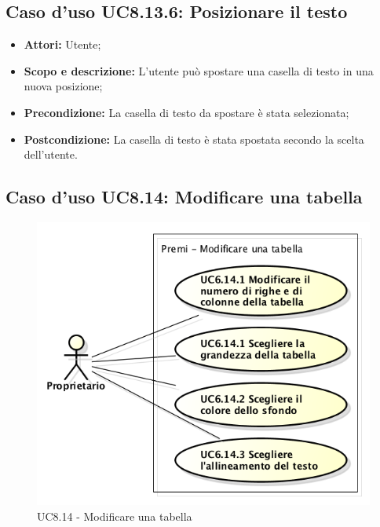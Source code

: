 \subsection{Caso d'uso UC8.13.6: Posizionare il testo}
\begin{itemize}
	\item \textbf{Attori:} Utente;
	\item \textbf{Scopo e descrizione:} L'utente può spostare una casella di testo in una nuova posizione;
	\item \textbf{Precondizione:} La casella di testo da spostare è stata selezionata;
	\item \textbf{Postcondizione:} La casella di testo è stata spostata secondo la scelta dell'utente.
\end{itemize}

\subsection{Caso d'uso UC8.14: Modificare una tabella}
\begin{figure}[h] 
	\centering 
	\includegraphics[scale=0.45] {img/UC8.14.png} 
	\caption{UC8.14 - Modificare una tabella} 
\end{figure}

